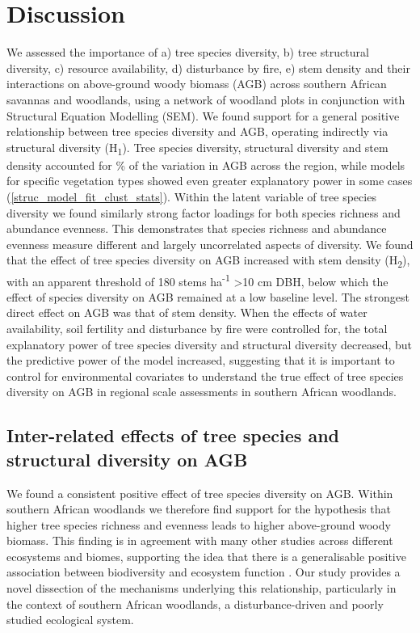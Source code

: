 \documentclass[11pt,a4paper]{article}
\begin{document}
\section{Discussion}

We assessed the importance of a) tree species diversity, b) tree structural diversity, c) resource availability, d) disturbance by fire, e) stem density and their interactions on above-ground woody biomass (AGB) across southern African savannas and woodlands, using a network of \nplots{} woodland plots in conjunction with Structural Equation Modelling (SEM). We found support for a general positive relationship between tree species diversity and AGB, operating indirectly via structural diversity (H\textsubscript{1}). Tree species diversity, structural diversity and stem density accounted for \smrsq{}\% of the variation in AGB across the region, while models for specific vegetation types showed even greater explanatory power in some cases (\autoref{struc_model_fit_clust_stats}). Within the latent variable of tree species diversity we found similarly strong factor loadings for both species richness and abundance evenness. This demonstrates that species richness and abundance evenness measure different and largely uncorrelated aspects of diversity. We found that the effect of tree species diversity on AGB increased with stem density (H\textsubscript{2}), with an apparent threshold of 180 stems ha\textsuperscript{-1} >10 cm DBH, below which the effect of species diversity on AGB remained at a low baseline level. The strongest direct effect on AGB was that of stem density. When the effects of water availability, soil fertility and disturbance by fire were controlled for, the total explanatory power of tree species diversity and structural diversity decreased, but the predictive power of the model increased, suggesting that it is important to control for environmental covariates to understand the true effect of tree species diversity on AGB in regional scale assessments in southern African woodlands.

\subsection{Inter-related effects of tree species and structural diversity on AGB}

We found a consistent positive effect of tree species diversity on AGB. Within southern African woodlands we therefore find support for the hypothesis that higher tree species richness and evenness leads to higher above-ground woody biomass. This finding is in agreement with many other studies across different ecosystems and biomes, supporting the idea that there is a generalisable positive association between biodiversity and ecosystem function \citep{Liang2016, Cardinale2009}. Our study provides a novel dissection of the mechanisms underlying this relationship, particularly in the context of southern African woodlands, a disturbance-driven and poorly studied ecological system.
\end{document}
